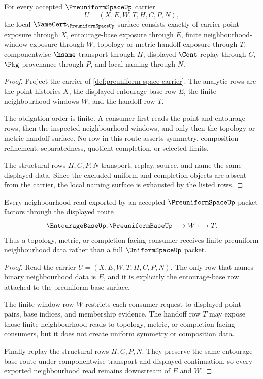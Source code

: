 \begin{theorem}
\label{thm:preuniform-space-namecert-obligations}
For every accepted $\PreuniformSpaceUp$ carrier
$$
U=(X,E,W,T,H,C,P,N),
$$
the local $\NameCert_{\PreuniformSpaceUp}$ surface consists exactly of carrier-point exposure through $X$, entourage-base exposure through $E$, finite neighbourhood-window exposure through $W$, topology or metric handoff exposure through $T$, componentwise $\hsame$ transport through $H$, displayed $\Cont$ replay through $C$, $\Pkg$ provenance through $P$, and local naming through $N$.
\end{theorem}
\begin{proof}
Project the carrier of \autoref{def:preuniform-space-carrier}. The analytic rows are the point histories $X$, the displayed entourage-base row $E$, the finite neighbourhood windows $W$, and the handoff row $T$.

The obligation order is finite. A consumer first reads the point and entourage rows, then the inspected neighbourhood windows, and only then the topology or metric handoff surface. No row in this route asserts symmetry, composition refinement, separatedness, quotient completion, or selected limits.

The structural rows $H,C,P,N$ transport, replay, source, and name the same displayed data. Since the excluded uniform and completion objects are absent from the carrier, the local naming surface is exhausted by the listed rows.
\end{proof}

\begin{theorem}
\label{thm:preuniform-space-entourage-base-route}
Every neighbourhood read exported by an accepted $\PreuniformSpaceUp$ packet factors through the displayed route
$$
\EntourageBaseUp,\PreuniformBaseUp \longmapsto W \longmapsto T .
$$
Thus a topology, metric, or completion-facing consumer receives finite preuniform neighbourhood data rather than a full $\UniformSpaceUp$ packet.
\end{theorem}
\begin{proof}
Read the carrier $U=(X,E,W,T,H,C,P,N)$. The only row that names binary neighbourhood data is $E$, and it is explicitly the entourage-base row attached to the preuniform-base surface.

The finite-window row $W$ restricts each consumer request to displayed point pairs, base indices, and membership evidence. The handoff row $T$ may expose those finite neighbourhood reads to topology, metric, or completion-facing consumers, but it does not create uniform symmetry or composition data.

Finally replay the structural rows $H,C,P,N$. They preserve the same entourage-base route under componentwise transport and displayed continuation, so every exported neighbourhood read remains downstream of $E$ and $W$.
\end{proof}

